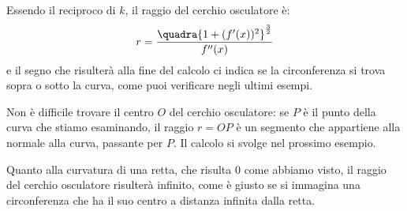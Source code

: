 Essendo il reciproco di \(k\), il raggio del cerchio osculatore è:
\[
 r=\dfrac{\quadra{1+(f'(x))^2}^{\frac{3}{2}}}{f''(x)}
\]
e il segno che risulterà alla fine del calcolo ci indica se la circonferenza si 
trova sopra o sotto la curva, come puoi verificare negli ultimi esempi.

Non è difficile trovare il centro \(O\) del cerchio osculatore: 
se \(P\) è il punto della curva che stiamo esaminando, il raggio \(r=OP\) è un 
segmento che appartiene alla normale alla curva, passante per \(P\). Il calcolo 
si svolge nel prossimo esempio.

Quanto alla curvatura di una retta, che risulta \(0\) come abbiamo visto, il 
raggio del cerchio osculatore risulterà infinito, come è giusto se si 
immagina una circonferenza che ha il suo centro a distanza infinita dalla 
retta.

